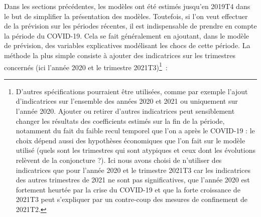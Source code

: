 \documentclass[
  a4paper,
  DIV=11,
  numbers=noendperiod,
  french]{scrartcl}
\newcommand\1{{\mathds 1}}
\theoremstyle{remark}
\begin{document}
Dans les sections précédentes, les modèles ont été estimés jusqu'en
2019T4 dans le but de simplifier la présentation des modèles. Toutefois,
si l'on veut effectuer de la prévision sur les périodes récentes, il est
indispensable de prendre en compte la période du COVID-19. Cela se fait
généralement en ajoutant, dans le modèle de prévision, des variables
explicatives modélisant les chocs de cette période. La méthode la plus
simple consiste à ajouter des indicatrices sur les trimestres concernés
(ici l'année 2020 et le trimestre 2021T3)\footnote{ D'autres
  spécifications pourraient être utilisées, comme par exemple l'ajout
  d'indicatrices sur l'ensemble des années 2020 et 2021 ou uniquement
  sur l'année 2020. Ajouter ou retirer d'autres indicatrices peut
  sensiblement changer les résultats des coefficients estimés sur la fin
  de la période, notamment du fait du faible recul temporel que l'on a
  après le COVID-19 : le choix dépend aussi des hypothèses économiques
  que l'on fait sur le modèle utilisé (quels sont les trimestres qui
  sont atypiques et ceux dont les évolutions relèvent de la conjoncture
  ?). Ici nous avons choisi de n'utiliser des indicatrices que pour
  l'année 2020 et le trimestre 2021T3 car les indicatrices des autres
  trimestres de 2021 ne sont pas significatives, que l'année 2020 est
  fortement heurtée par la crise du COVID-19 et que la forte croissance
  de 2021T3 peut s'expliquer par un contre-coup des mesures de
  confinement de 2021T2.}~:
\end{document}
